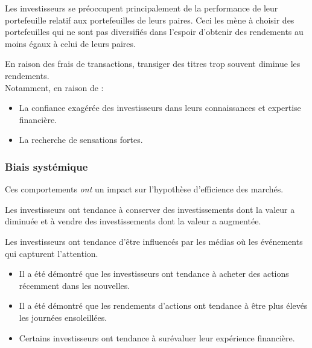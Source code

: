 \documentclass[10pt, french]{article}
\begin{document}
\begin{multicols*}{2}
\begin{definitionNOHFILLsub}
\begin{definitionNOHFILLprop}
Les investisseurs se préoccupent principalement de la performance de leur portefeuille relatif aux portefeuilles de leurs paires. Ceci les mène à choisir des portefeuilles qui ne sont pas diversifiés dans l'espoir d'obtenir des rendements au moins égaux à celui de leurs paires.
\end{definitionNOHFILLprop}
\end{definitionNOHFILLsub}

\begin{definitionNOHFILLsub}
En raison des frais de transactions, transiger des titres trop souvent diminue les rendements. 	\\

Notamment, en raison de : 
\begin{itemize}
	\item	La confiance exagérée des investisseurs dans leurs connaissances et expertise financière.
	\item	La recherche de sensations fortes.
\end{itemize}
\end{definitionNOHFILLsub}


\subsubsection{Biais systémique}
Ces comportements \textit{\textit{ont}} un impact sur l'hypothèse d'efficience des marchés.

\begin{definitionNOHFILLsub}
Les investisseurs ont tendance à conserver des investissements dont la valeur a diminuée et à vendre des investissements dont la valeur a augmentée.
\end{definitionNOHFILLsub}

\begin{definitionNOHFILLsub}
Les investisseurs ont tendance d'être influencés par les médias où les événements qui capturent l'attention.
\begin{itemize}
	\item	Il a été démontré que les investisseurs ont tendance à acheter des actions récemment dans les nouvelles.
	\item	Il a été démontré que les rendements d'actions ont tendance à être plus élevés les journées ensoleillées.
	\item	Certains investisseurs ont tendance à surévaluer leur expérience financière.
\end{itemize}
\end{definitionNOHFILLsub}


\end{multicols*}
\end{document}
